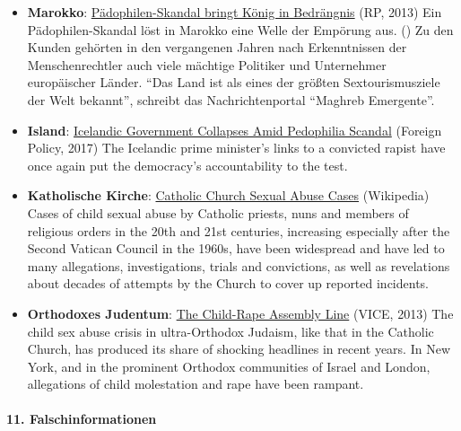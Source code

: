 \begin{itemize}
{  geraubte Kinder} (Tagesspiegel, 2013) Unter der Diktatur Francos
  wurden sie für tot erklärt und verschleppt. Tausende Kinder wurden
  ihren Müttern weggenommen, um sie bei regimetreuen Familien aufwachsen
  zu lassen. Erst spät kam die Lüge zutage. Jetzt suchen die Opfer nach
  ihren Wurzeln.
\item
  \textbf{Marokko}:
  \href{https://rp-online.de/panorama/ausland/paedophilen-skandal-bringt-koenig-in-bedraengnis_aid-15188291}{Pädophilen-Skandal
  bringt König in Bedrängnis} (RP, 2013) Ein Pädophilen-Skandal löst in
  Marokko eine Welle der Empörung aus. () Zu den Kunden gehörten in den
  vergangenen Jahren nach Erkenntnissen der Menschenrechtler auch viele
  mächtige Politiker und Unternehmer europäischer Länder. ``Das Land ist
  als eines der größten Sextourismusziele der Welt bekannt'', schreibt
  das Nachrichtenportal ``Maghreb Emergente''.
\item
  \textbf{Island}:
  \href{https://foreignpolicy.com/2017/09/15/icelandic-government-collapses-amid-pedophilia-scandal/}{Icelandic
  Government Collapses Amid Pedophilia Scandal} (Foreign Policy, 2017)
  The Icelandic prime minister's links to a convicted rapist have once
  again put the democracy's accountability to the test.
\item
  \textbf{Katholische Kirche}:
  \href{https://en.wikipedia.org/wiki/Catholic_Church_sexual_abuse_cases}{Catholic
  Church Sexual Abuse Cases} (Wikipedia) Cases of child sexual abuse by
  Catholic priests, nuns and members of religious orders in the 20th and
  21st centuries, increasing especially after the Second Vatican Council
  in the 1960s, have been widespread and have led to many allegations,
  investigations, trials and convictions, as well as revelations about
  decades of attempts by the Church to cover up reported incidents.
\item
  \textbf{Orthodoxes Judentum}:
  \href{https://www.vice.com/en_us/article/qbe8bp/the-child-rape-assembly-line-0000141-v20n11}{The
  Child-Rape Assembly Line} (VICE, 2013) The child sex abuse crisis in
  ultra-Orthodox Judaism, like that in the Catholic Church, has produced
  its share of shocking headlines in recent years. In New York, and in
  the prominent Orthodox communities of Israel and London, allegations
  of child molestation and rape have been rampant.
\end{itemize}

\hypertarget{11-falschinformationen}{%
\paragraph{11. Falschinformationen}\label{11-falschinformationen}}

